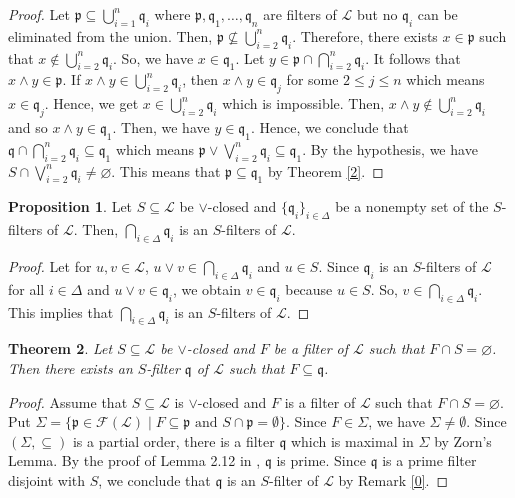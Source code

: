 \documentclass[preprint,review,10pt]{amsart}
\newtheorem{theorem}{Theorem}[section]
\theoremstyle{definition}
\newtheorem{proposition}[theorem]{Proposition}
\theoremstyle{remark}
\numberwithin{equation}{section}
\begin{document}
\begin{proof}
Let $\mathfrak{p} \subseteq \bigcup_{i=1}^n \mathfrak{q}_i$ where  $\mathfrak {p},\mathfrak{q}_1,\ldots,  \mathfrak{q}_n$ are   filters of $\mathscr{L}$ but no $\mathfrak{q}_i$ can be eliminated from the union. Then, $\mathfrak{p} \nsubseteq \bigcup_{i=2}^n \mathfrak{q}_i$. Therefore, there exists $x \in  \mathfrak{p}$ such that $x \notin \bigcup_{i=2}^n \mathfrak{q}_i$. So, we have $x \in \mathfrak{q}_1$. Let $y \in \mathfrak{p} \cap \bigcap_{i=2}^n \mathfrak{q}_i$. It follows that $x \wedge y \in  \mathfrak {p}$. If $x \wedge y \in \bigcup_{i=2}^n \mathfrak{q}_i$, then $x \wedge y \in \mathfrak{q}_j$ for some $2 \leq j \leq n$ which means $x \in \mathfrak{q}_j$. Hence, we get  $x \in \bigcup_{i=2}^n \mathfrak{q}_i$ which is impossible. Then, $x \wedge y \notin \bigcup_{i=2}^n \mathfrak{q}_i$ and so $x \wedge y \in \mathfrak{q}_1$. Then, we have  $y \in \mathfrak{q}_1$. Hence, we conclude that $\mathfrak{q} \cap \bigcap_{i=2}^n \mathfrak{q}_i \subseteq \mathfrak{q}_1$ which means $\mathfrak{p} \vee \bigvee_{i=2}^n \mathfrak{q}_i \subseteq \mathfrak{q}_1$. By the hypothesis, we have  $S \cap \bigvee_{i=2}^n \mathfrak{q}_i \neq \varnothing$. This means that $\mathfrak{p} \subseteq \mathfrak{q}_1$ by Theorem \ref{2}.
\end{proof}
\begin{proposition} \label{intersection}
Let $S \subseteq \mathscr{L}$ be   $\vee$-closed and $\{\mathfrak{q}_i\}_{i\in \Delta}$ be a nonempty set of the  $S$-filters of $\mathscr{L}$. Then, $\bigcap_{i\in \Delta} \mathfrak{q}_i$ is an $S$-filters of $\mathscr{L}$.
\end{proposition}
\begin{proof}
Let for $u,v \in \mathscr{L}$, $u \vee v \in \bigcap_{i\in \Delta} \mathfrak{q}_i$  and $u \in S$. Since $\mathfrak{q}_i$ is an $S$-filters of $\mathscr{L}$ for all $i\in \Delta$ and $u \vee v \in \mathfrak{q}_i$, we obtain $v \in \mathfrak{q}_i$ because $u \in S$. So, $v \in \bigcap_{i\in \Delta}\mathfrak{q}_i$. This implies that  $\bigcap_{i\in \Delta} \mathfrak{q}_i$ is an $S$-filters of $\mathscr{L}$.
\end{proof}
\begin{theorem} \label{khamen}
Let $S \subseteq \mathscr{L}$ be   $\vee$-closed and  $F$ be  a filter of $\mathscr{L}$  such that $F \cap S= \varnothing$. Then there exists an $S$-filter $\mathfrak{q}$ of $\mathscr{L}$ such that $F \subseteq \mathfrak{q}$.
\end{theorem}
\begin{proof}
Assume that  $S \subseteq \mathscr{L}$ is    $\vee$-closed  and $F$ is a filter of $\mathscr{L}$  such that $F \cap S= \varnothing$. Put $\Sigma = \{\mathfrak{p} \in \mathcal{F}(\mathscr{L}) \mid F \subseteq \mathfrak{p} \text{ and } S \cap \mathfrak{p}  = \emptyset\}$. Since $F \in \Sigma$,  we have $\Sigma \neq \emptyset$.  Since $(\Sigma, \subseteq)$ is a partial order, there is a filter 
$\mathfrak{q}$ which is maximal in
$\Sigma$ by Zorn's Lemma. By the proof of Lemma 2.12 in \cite{Atani2}, $\mathfrak{q}$ is prime. Since $\mathfrak{q}$ is a prime filter disjoint with $S$, we conclude that $\mathfrak{q}$ is an $S$-filter of $\mathscr{L}$ by Remark \ref{0}.
\end{proof}
\end{document}
